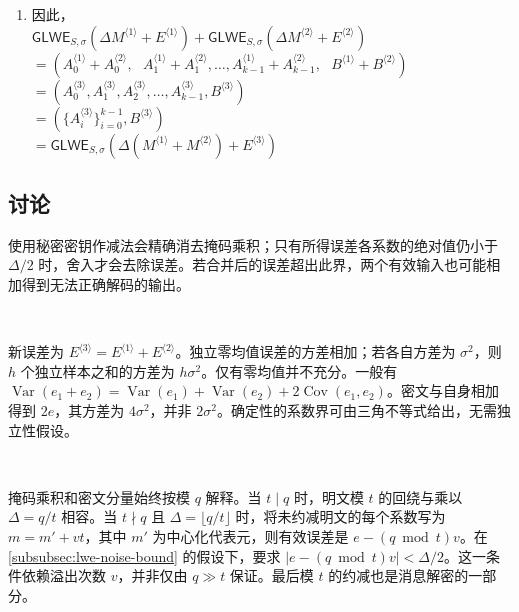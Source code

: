 \begin{myproof}
\begin{enumerate}
因此 $(A_0^{\langle 3 \rangle}, A_1^{\langle 3 \rangle}, A_2^{\langle 3 \rangle}, \ldots, A_{k-1}^{\langle 3 \rangle}, B^{\langle 3 \rangle})$ 构成密文 $\textsf{GLWE}_{S, \sigma}(\Delta \cdot (M^{\langle 1 \rangle} + M^{\langle 2 \rangle}) + E^{\langle 3 \rangle})$。 \\
\item 因此， \\
$\textsf{GLWE}_{S, \sigma}(\Delta M^{\langle 1 \rangle} + E^{\langle 1 \rangle}) + \textsf{GLWE}_{S, \sigma}(\Delta M^{\langle 2 \rangle} + E^{\langle 2 \rangle})$ \\
$ = ( A_0^{\langle 1 \rangle} + A_0^{\langle 2 \rangle}, \text{ } A_1^{\langle 1 \rangle} + A_1^{\langle 2 \rangle},\ldots, A_{k-1}^{\langle 1 \rangle} + A_{k-1}^{\langle 2 \rangle}, \text{ } B^{\langle 1 \rangle} + B^{\langle 2 \rangle} )$ \\
$ = ( A_0^{\langle 3 \rangle}, A_1^{\langle 3 \rangle}, A_2^{\langle 3 \rangle}, \ldots,  A_{k-1}^{\langle 3 \rangle}, B^{\langle 3 \rangle})$ \\
$ = ( \{A_i^{\langle 3 \rangle}\}_{i=0}^{k-1}, B^{\langle 3 \rangle})$ \\
$= \textsf{GLWE}_{S, \sigma}(\Delta (M^{\langle 1 \rangle} + M^{\langle 2 \rangle}) + E^{\langle 3 \rangle})$


\end{enumerate}
\end{myproof}

\subsection{讨论}
\label{subsubsec:glwe-add-cipher-discuss} 

使用秘密密钥作减法会精确消去掩码乘积；只有所得误差各系数的绝对值仍小于 $\Delta/2$ 时，舍入才会去除误差。若合并后的误差超出此界，两个有效输入也可能相加得到无法正确解码的输出。

$ $

新误差为 $E^{\langle3\rangle}=E^{\langle1\rangle}+E^{\langle2\rangle}$。独立零均值误差的方差相加；若各自方差为 $\sigma^2$，则 $h$ 个独立样本之和的方差为 $h\sigma^2$。仅有零均值并不充分。一般有 $\operatorname{Var}(e_1+e_2)=\operatorname{Var}(e_1)+\operatorname{Var}(e_2)+2\operatorname{Cov}(e_1,e_2)$。密文与自身相加得到 $2e$，其方差为 $4\sigma^2$，并非 $2\sigma^2$。确定性的系数界可由三角不等式给出，无需独立性假设。

$ $

掩码乘积和密文分量始终按模 $q$ 解释。当 $t\mid q$ 时，明文模 $t$ 的回绕与乘以 $\Delta=q/t$ 相容。当 $t\nmid q$ 且 $\Delta=\lfloor q/t\rfloor$ 时，将未约减明文的每个系数写为 $m=m'+vt$，其中 $m'$ 为中心化代表元，则有效误差是 $e-(q\bmod t)v$。在 \autoref{subsubsec:lwe-noise-bound} 的假设下，要求 $|e-(q\bmod t)v|<\Delta/2$。这一条件依赖溢出次数 $v$，并非仅由 $q\gg t$ 保证。最后模 $t$ 的约减也是消息解密的一部分。

 
